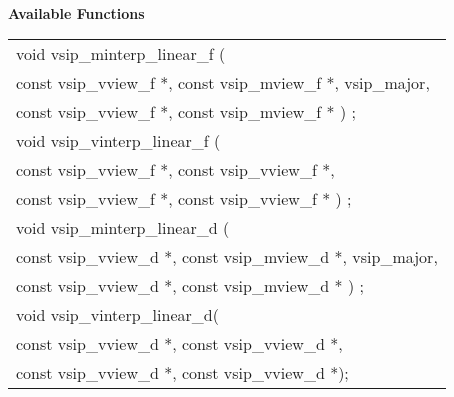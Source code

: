 \\\cvsiplh
\newline \hspace*{.8cm} \vspace*{.1cm} \textbf{Available Functions }
\newline \hspace*{1.1cm} {
\ttfamily
\begin{tabular}{l}
void vsip\_minterp\_linear\_f (\\*\hspace{1cm}const vsip\_vview\_f *, const vsip\_mview\_f *, vsip\_major,\\*\hspace{1cm}const vsip\_vview\_f *, const vsip\_mview\_f * ) ;\\
void vsip\_vinterp\_linear\_f (\\*\hspace{1cm}const vsip\_vview\_f *, const vsip\_vview\_f *,\\*\hspace{1cm}const vsip\_vview\_f *, const vsip\_vview\_f * ) ;\\
void vsip\_minterp\_linear\_d (\\*\hspace{1cm}const vsip\_vview\_d *, const vsip\_mview\_d *, vsip\_major,\\*\hspace{1cm}const vsip\_vview\_d *, const vsip\_mview\_d * ) ;\\
void vsip\_vinterp\_linear\_d(\\*\hspace{1cm}const vsip\_vview\_d *, const vsip\_vview\_d *,\\*\hspace{1cm}const vsip\_vview\_d *, const vsip\_vview\_d *);\\
\end{tabular}
}\\
\pyjvsiph
{}
